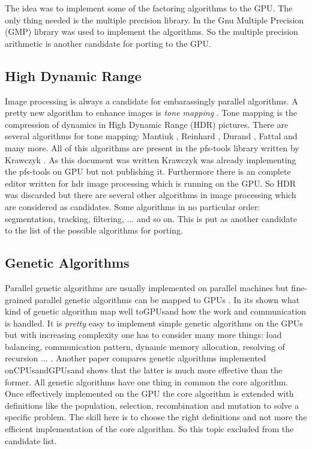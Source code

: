 The idea was to implement some of the factoring algorithms to the GPU. The only
thing needed is the multiple precision library. In \citep{citeulike:3783254} the
Gnu Multiple Precision (GMP) library was used to implement the algorithms. So
the multiple precision arithmetic is another candidate for porting to the GPU.
\subsection{High Dynamic Range} %
\label{par:high_dynamic_range}
Image processing is always a candidate for embarassingly parallel algorithms. A
pretty new algorithm to enhance images is \emph{tone mapping}
\citep{citeulike:3783303}. Tone mapping is the compression of dynamics in High
Dynamic Range (HDR) pictures. There are several algorithms for tone mapping:
Mantiuk \citep{citeulike:3783315}, Reinhard \citep{citeulike:3783311}, Durand
\citep{citeulike:789299}, Fattal \citep{citeulike:3783313} and many more. All of
this algorithms are present in the pfs-tools library written by Krawczyk
\citep{citeulike:3783303}. As this document was written Krawczyk was already
implementing the pfs-tools on \gls{GPU} but not publishing it. Furthermore there is an
complete editor written for hdr image processing which is running on the GPU. So
HDR was discarded but there are several other algorithms in image processing
which are considered as candidates. Some algorithms in no particular order:
segmentation, tracking, filtering, ... and so on. This is put as another
candidate to the list of the possible algorithms for porting. 

\subsection{Genetic Algorithms} %
\label{par:genetic_algorithms}
Parallel genetic algorithms are usually implemented on parallel machines but
fine-grained parallel genetic algorithms can be mapped to GPUs
\citep{citeulike:3801879}. In \citep{citeulike:3801866} its shown what kind of
genetic algorithm map well to\glspl{GPU}and how the work and communication is
handled. It is \emph{pretty} easy to implement simple genetic algorithms on the
GPUs but with increasing complexity one has to consider many more things: load
balancing, communication pattern, dynamic memory allocation, resolving of
recursion ... . Another paper \citep{citeulike:3801883} compares genetic
algorithms implemented on\glspl{CPU}and\glspl{GPU}and shows that the latter is much more
effective than the former. All genetic algorithms have one thing in common the
core algorithm. Once effectively implemented on the \gls{GPU} the core algorithm is
extended with definitions like the population, selection, recombination and
mutation to solve a specific problem. The skill here is to choose the right
definitions and not more the efficient implementation of the core algorithm. So
this topic excluded from the candidate list.

